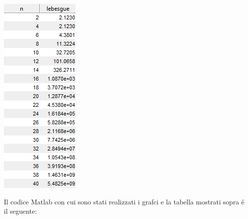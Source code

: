 \begin{center}
	\includegraphics[scale=0.7]{cap4/4_9/4_9.png}
\end{center}

\noindent Il codice Matlab con cui sono stati realizzati i grafci e la tabella mostrati sopra \'e il seguente: \\



